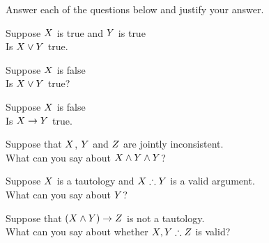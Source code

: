 \begin{practiceproblems}
	
	\solutions
	\problempart
	\label{pr:TT:concepts}
	Answer each of the questions below and justify your answer.
	\begin{problemslist}
		\item Suppose $X$ is true and $Y$ is true\\Is $X\vee Y$ true.\myanswer{\\true}
		\item Suppose $X$ is false \\Is $X\vee Y$ true?
		\item Suppose $X$ is false \\Is $X\rightarrow Y$ true. \myanswer{\\true}
		\item Suppose that $X$, $Y$ and $Z$  are jointly inconsistent. \\What can you say about $X\mathbin{\wedge}Y\mathbin{\wedge}Y$?
		\item Suppose $X$ is a tautology and  $\metaX\therefore\metaY$ is a valid argument. \\What can you say about $Y$?
		\item Suppose that $(X\mathbin{\wedge}Y)\rightarrow Z$ is not a tautology.\\ What can you say about whether $\metaX, \metaY \therefore\metaZ$ is valid?

\end{problemslist}
\end{practiceproblems}
